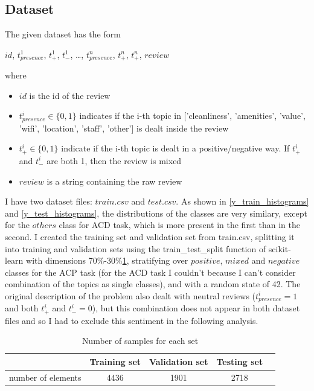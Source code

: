 \documentclass{article}
\begin{document}
        \subsection{Dataset}\label{subsec:datset}
        The given dataset has the form
        \\\centerline{$id$, $t^{1}_{presence}$, $t^{1}_{+}$, $t^{1}_{-}$, \ldots , $t^{n}_{presence}$, $t^{n}_{+}$, $t^{n}_{+}$, $review$}
        where
        \begin{itemize}
            \item $id$ is the id of the review
            \item $t^{i}_{presence} \in \{0, 1\}$ indicates if the i-th topic in ['cleanliness', 'amenities', 'value', 'wifi', 'location', 'staff', 'other'] is dealt inside the review
            \item $t^{i}_{+} \in \{0, 1\}$ indicate if the i-th topic is dealt in a positive/negative way.
            If $t^{i}_{+}$ and $t^{i}_{-}$ are both 1, then the review is mixed
            \item $review$ is a string containing the raw review
        \end{itemize}
        I have two dataset files: $train.csv$ and $test.csv$.
        As shown in \ref{y_train_histograms} and \ref{y_test_histograms}, the distributions of the classes are very similary, except for the $others$ class for ACD task, which is more present in the first than in the second.
        I created the training set and validation set from train.csv, splitting it into training and validation sets using the train\_test\_split function of scikit-learn with dimensions 70\%-30\%\ref{tab:table1}, stratifying over $positive$, $mixed$ and $negative$ classes for the ACP task (for the ACD task I couldn't because I can't consider combination of the topics as single classes), and with a random state of 42.
        The original description of the problem also dealt with neutral reviews ($t^{i}_{presence} = 1$ and both $t^{i}_{+}$ and $t^{i}_{-} = 0$), but this combination does not appear in both dataset files and so I had to exclude this sentiment in the following analysis.
        \begin{table}[h!]
            \begin{center}
                \caption{Number of samples for each set}
                \label{tab:table1}
                \begin{tabular}{l|c|c|c|r}
                    \textbf{} & \textbf{Training set} & \textbf{Validation set} & \textbf{Testing set}\\
                    \hline
                        number of elements & 4436 & 1901 & 2718\\
                \end{tabular}
            \end{center}
        \end{table}
\end{document}
